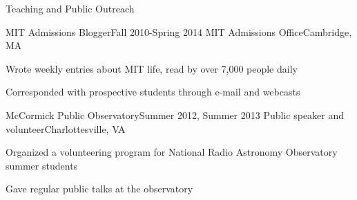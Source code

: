 \documentclass{resume} %
\begin{document}
\begin{rSection}{Teaching and Public Outreach}
  \begin{rSubsection}{MIT Admissions Blogger}{Fall 2010-Spring 2014}
    {MIT Admissions Office}{Cambridge, MA}
  \item Wrote weekly entries about MIT life, read by over 7,000 people daily
  \item Corresponded with prospective students through e-mail and webcasts
  \end{rSubsection}

  \begin{rSubsection}{McCormick Public Observatory}{Summer 2012, Summer 2013}
    {Public speaker and volunteer}{Charlottesville, VA}
  \item Organized a volunteering program for National Radio Astronomy Observatory 
    summer students
  \item Gave regular public talks at the observatory
  \end{rSubsection}

\end{rSection}
\end{document}
